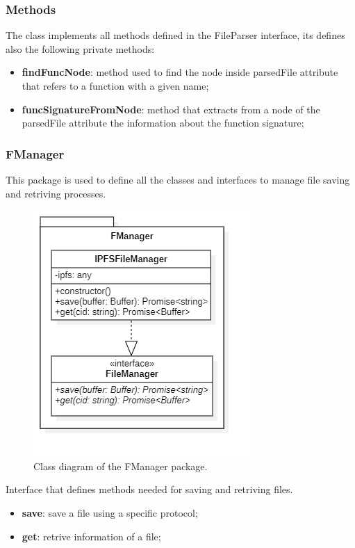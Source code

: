 				\subsubsection*{Methods}
				The class implements all methods defined in the FileParser interface, its defines also the following private methods: 
				\begin{itemize}
					\item \textbf{findFuncNode}: method used to find the node inside parsedFile attribute that refers to a function with a given name; 
					\item \textbf{funcSignatureFromNode}: method that extracts from a node of the parsedFile attribute the information about the function signature; 
				\end{itemize}
			
		\subsubsection{FManager} 			
		This package is used to define all the classes and interfaces to manage file saving and retriving processes.
		\begin{figure} [h!]
			\centering
			\includegraphics[width=0.5\linewidth]{diagrammi/etherless-cli/FManager}
			\caption{Class diagram of the FManager package.}
		\end{figure}	
				
			Interface that defines methods needed for saving and retriving files. 
		
					\begin{itemize}
						\item \textbf{save}: save a file using a specific protocol;
						\item \textbf{get}: retrive information of a file; 
				\end{itemize}
			
